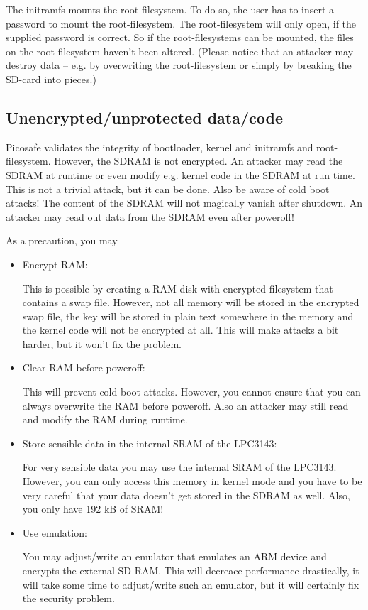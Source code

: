 The initramfs mounts the root-filesystem. To do so, the user has to insert a
password to mount the root-filesystem. The root-filesystem will only open, if
the supplied password is correct. So if the root-filesystems can be mounted,
the files on the root-filesystem haven't been altered. (Please notice that an
attacker may destroy data – e.g. by overwriting the root-filesystem or simply
by breaking the SD-card into pieces.)

\subsection{Unencrypted/unprotected data/code}

Picosafe validates the integrity of bootloader, kernel and initramfs and
root-filesystem. However, the SDRAM is not encrypted. An attacker may read the
SDRAM at runtime or even modify e.g. kernel code in the SDRAM at run time. This
is not a trivial attack, but it can be done. Also be aware of cold boot
attacks! The content of the SDRAM will not magically vanish after shutdown. An
attacker may read out data from the SDRAM even after poweroff!

As a precaution, you may
\begin{itemize}
\item Encrypt RAM:

This is possible by creating a RAM disk with encrypted filesystem that contains
a swap file. However, not all memory will be stored in the encrypted swap file,
the key will be stored in plain text somewhere in the memory and the kernel
code will not be encrypted at all. This will make attacks a bit harder, but it
won't fix the problem.
\item Clear RAM before poweroff:

This will prevent cold boot attacks. However, you cannot ensure that you can
always overwrite the RAM before poweroff. Also an attacker may still read and
modify the RAM during runtime.
\item Store sensible data in the internal SRAM of the LPC3143:

For very sensible data you may use the internal SRAM of the LPC3143. However,
you can only access this memory in kernel mode and you have to be very careful
that your data doesn't get stored in the SDRAM as well. Also, you only have 192
kB of SRAM!
\item Use emulation:

You may adjust/write an emulator that emulates an ARM device and encrypts the
external SD-RAM. This will decreace performance drastically, it will take some
time to adjust/write such an emulator, but it will certainly fix the security
problem.
\end{itemize}

